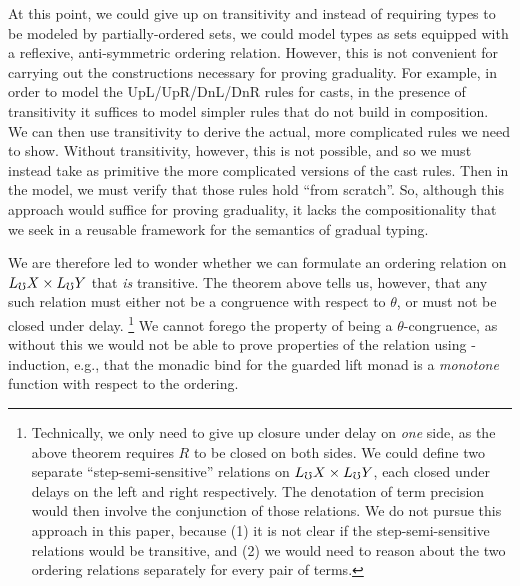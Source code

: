 
At this point, we could give up on transitivity and instead of requiring types
to be modeled by partially-ordered sets, we could model types as sets equipped
with a reflexive, anti-symmetric ordering relation. However, this is not
convenient for carrying out the constructions necessary for proving graduality.
For example, in order to model the UpL/UpR/DnL/DnR rules for casts, in the
presence of transitivity it suffices to model simpler rules that do not build in
composition. We can then use transitivity to derive the actual, more complicated
rules we need to show.
Without transitivity, however, this is not possible, and so we must instead take as
primitive the more complicated versions of the cast rules. Then in the model, we
must verify that those rules hold ``from scratch''. So, although this approach
would suffice for proving graduality, it lacks the compositionality that we seek
in a reusable framework for the semantics of gradual typing.

We are therefore led to wonder whether we can formulate an ordering
relation on $L_\mho X \times L_\mho Y$ that \emph{is} transitive. The theorem above
tells us, however, that any such relation must either not be a congruence with
respect to $\theta$, or must not be closed under delay.
\footnote{Technically, we only need to give up closure under delay on \emph{one}
side, as the above theorem requires $R$ to be closed on both sides. We could
define two separate ``step-semi-sensitive'' relations on $L_\mho X \times L_\mho Y$,
each closed under delays on the left and right respectively. The denotation of
term precision would then involve the conjunction of those relations. We do not
pursue this approach in this paper, because (1) it is not clear if the
step-semi-sensitive relations would be transitive, and (2) we would need to
reason about the two ordering relations separately for every pair of terms.}
%
We cannot forego the property of being a $\theta$-congruence, as without this we
would not be able to prove properties of the relation using \lob-induction,
e.g., that the monadic bind for the guarded lift monad is a \emph{monotone}
function with respect to the ordering.

